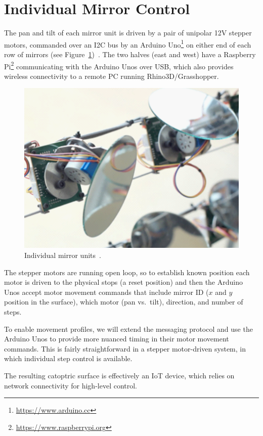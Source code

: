 \section{Individual Mirror Control}
\label{sec:mirror}

The pan and tilt of each mirror unit is driven by a pair of
unipolar 12V stepper motors, commanded over an I2C bus by an
Arduino Uno\footnote{\url{https://www.arduino.cc}} on either end of
each row of mirrors (see Figure~\ref{fig:mirror})~\cite{acadia18}.
The two halves (east and west) have a
Raspberry Pi\footnote{\url{https://www.raspberrypi.org}}
communicating with the Arduino Unos over USB, which also provides
wireless connectivity to a remote PC running Rhino3D/Grasshopper.

\begin{figure}[ht]
\includegraphics[width=0.6\columnwidth]{mirror}
\caption{Individual mirror units~\protect\cite{acadia18}.}
\label{fig:mirror}
\end{figure}

The stepper motors are running open loop,
so to establish known position each
motor is driven to the physical stops (a reset position) and then
the Arduino Unos accept motor movement commands that include
mirror ID ($x$ and $y$ position in the surface), which motor (pan vs.\ tilt),
direction, and number of steps.

To enable movement profiles, we will extend the messaging protocol
and use the Arduino Unos to provide more nuanced timing in their
motor movement commands. This is fairly straightforward in a stepper
motor-driven system, in which individual step control is available.

The resulting catoptric surface is effectively an IoT device, which
relies on network connectivity for high-level control.
